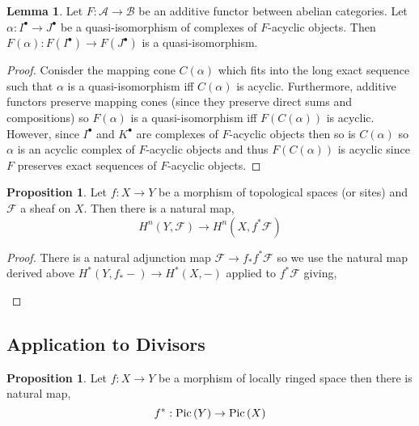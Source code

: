 \documentclass[12pt]{extarticle}
\theoremstyle{definition}
\newtheorem{lemma}[theorem]{Lemma}
\newtheorem{proposition}[theorem]{Proposition}
\newcommand{\F}{\mathcal{F}}
\begin{document}
\begin{lemma}
Let $F : \mathcal{A} \to \mathcal{B}$ be an additive functor between abelian categories. Let $\alpha : I^\bullet \to J^\bullet$ be a quasi-isomorphism of complexes of $F$-acyclic objects. Then $F(\alpha) : F(I^\bullet) \to F(J^\bullet)$ is a quasi-isomorphism. 
\end{lemma}

\begin{proof}
Conisder the mapping cone $C(\alpha)$ which fits into the long exact sequence such that $\alpha$ is a quasi-isomorphism iff $C(\alpha)$ is acyclic. Furthermore, additive functors preserve mapping cones (since they preserve direct sums and compositions) so $F(\alpha)$ is a quasi-isomorphism iff $F(C(\alpha))$ is acyclic. However, since $I^\bullet$ and $K^\bullet$ are complexes of $F$-acyclic objects then so is $C(\alpha)$ so $\alpha$ is an acyclic complex of $F$-acyclic objects and thus $F(C(\alpha))$ is acyclic since $F$ preserves exact sequences of $F$-acyclic objects. 
\end{proof}

\begin{proposition}
Let $f : X \to Y$ be a morphism of topological spaces (or sites) and $\F$ a sheaf on $X$. Then there is a natural map,
\[ H^n(Y, \F) \to H^n(X, f^* \F) \]
\end{proposition}

\begin{proof}
There is a natural adjunction map $\F \to f_* f^* \F$ so we use the natural map derived above $H^*(Y, f_* -) \to H^*(X, - )$ applied to $f^* \F$ giving,
\begin{center}
\end{center}
\end{proof}


\subsection{Application to Divisors}

\begin{proposition}
Let $f : X \to Y$ be a morphism of locally ringed space then there is natural map,
\[ f^* : \mathrm{Pic}\left( Y \right) \to \mathrm{Pic}\left( X \right) \]
\end{proposition}
\end{document}
